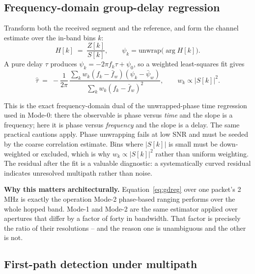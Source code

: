 \documentclass[11pt,a4paper]{article}
\begin{document}
\subsection{Frequency-domain group-delay regression}
\label{sec:gd}

Transform both the received segment and the reference, and form the channel estimate over the
in-band bins $k$:
\begin{equation}
H[k] \;=\; \frac{Z[k]}{S[k]},
\qquad
\psi_k = \mathrm{unwrap}\bigl(\arg H[k]\bigr).
\label{eq:Hk}
\end{equation}
A pure delay $\tau$ produces $\psi_k = -2\pi f_k \tau + \psi_0$, so a weighted least-squares fit
gives
\begin{equation}
\hat\tau \;=\; -\frac{1}{2\pi}\,
\frac{\sum_k w_k (f_k - \bar f_w)(\psi_k - \bar\psi_w)}
     {\sum_k w_k (f_k - \bar f_w)^2},
\qquad
w_k \propto |S[k]|^2 .
\label{eq:gdreg}
\end{equation}

This is the exact frequency-domain dual of the unwrapped-phase time regression used in Mode-0: there
the observable is phase versus \emph{time} and the slope is a frequency; here it is phase versus
\emph{frequency} and the slope is a delay. The same practical cautions apply. Phase unwrapping fails
at low SNR and must be seeded by the coarse correlation estimate. Bins where $|S[k]|$ is small must
be down-weighted or excluded, which is why $w_k \propto |S[k]|^2$ rather than uniform weighting.
The residual after the fit is a valuable diagnostic: a systematically curved residual indicates
unresolved multipath rather than noise.

\begin{callout}
\textbf{Why this matters architecturally.} Equation~\eqref{eq:gdreg} over one packet's 2\,MHz is
exactly the operation Mode-2 phase-based ranging performs over the whole hopped band. Mode-1 and
Mode-2 are the same estimator applied over apertures that differ by a factor of forty in bandwidth.
That factor is precisely the ratio of their resolutions -- and the reason one is unambiguous and
the other is not.
\end{callout}

\subsection{First-path detection under multipath}
\label{sec:firstpath}
\end{document}
